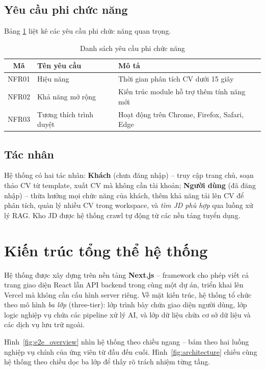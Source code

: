 \documentclass[../DoAn.tex]{subfiles}
\begin{document}
\subsection{Yêu cầu phi chức năng}

Bảng \ref{tab:nonfunc_req} liệt kê các yêu cầu phi chức năng quan trọng.

\begin{table}[H]
\centering
\caption{Danh sách yêu cầu phi chức năng}
\label{tab:nonfunc_req}
\begin{tabular}{|c|l|p{8cm}|}
\hline
\textbf{Mã} & \textbf{Tên yêu cầu} & \textbf{Mô tả} \\ \hline
NFR01 & Hiệu năng & Thời gian phân tích CV dưới 15 giây \\ \hline
NFR02 & Khả năng mở rộng & Kiến trúc module hỗ trợ thêm tính năng mới \\ \hline
NFR03 & Tương thích trình duyệt & Hoạt động trên Chrome, Firefox, Safari, Edge \\ \hline
\end{tabular}
\end{table}

\subsection{Tác nhân}

Hệ thống có hai tác nhân: \textbf{Khách} (chưa đăng nhập) -- truy cập trang chủ, soạn thảo CV từ template, xuất CV mà không cần tài khoản; \textbf{Người dùng} (đã đăng nhập) -- thừa hưởng mọi chức năng của khách, thêm khả năng tải lên CV để phân tích, quản lý nhiều CV trong workspace, và \textit{tìm JD phù hợp} qua luồng xử lý RAG. Kho JD được hệ thống crawl tự động từ các nền tảng tuyển dụng.

\section{Kiến trúc tổng thể hệ thống}

Hệ thống được xây dựng trên nền tảng \textbf{Next.js} -- framework cho phép viết cả trang giao diện React lẫn API backend trong cùng một dự án, triển khai lên Vercel mà không cần cấu hình server riêng. Về mặt kiến trúc, hệ thống tổ chức theo mô hình \textit{ba lớp} (three-tier): lớp trình bày chứa giao diện người dùng, lớp logic nghiệp vụ chứa các pipeline xử lý AI, và lớp dữ liệu chứa cơ sở dữ liệu và các dịch vụ lưu trữ ngoài.

Hình~\ref{fig:e2e_overview} nhìn hệ thống theo chiều ngang -- bám theo hai luồng nghiệp vụ chính của ứng viên từ đầu đến cuối. Hình~\ref{fig:architecture} chiếu cùng hệ thống theo chiều dọc ba lớp để thấy rõ trách nhiệm từng tầng.
\end{document}
